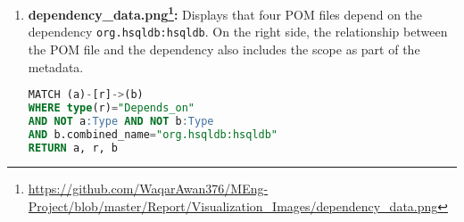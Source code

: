 \begin{enumerate}[before={\vspace{10pt}}, after={\vspace{10pt}}, itemsep=10pt, nosep, leftmargin=\parindent, labelindent=0pt]
\item \textbf{dependency\_data.png\footnote{\url{https://github.com/WaqarAwan376/MEng-Project/blob/master/Report/Visualization_Images/dependency_data.png}}:} Displays that four POM files depend on the dependency \texttt{org.hsqldb:hsqldb}. On the right side, the relationship between the POM file and the dependency also includes the scope as part of the metadata.
\begin{lstlisting}[language=SQL]
MATCH (a)-[r]->(b)
WHERE type(r)="Depends_on"
AND NOT a:Type AND NOT b:Type
AND b.combined_name="org.hsqldb:hsqldb"
RETURN a, r, b
\end{lstlisting}
\vspace{10pt}

\end{enumerate}

